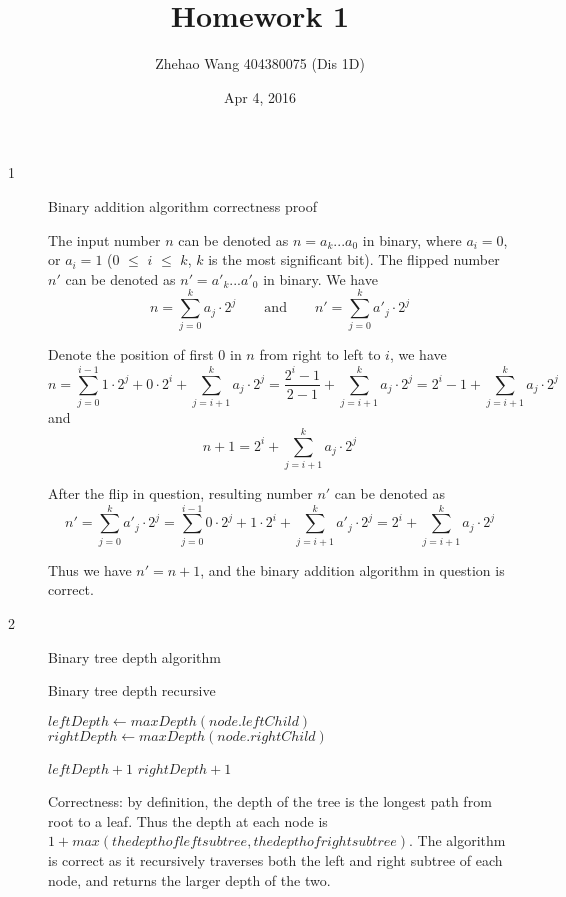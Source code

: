\documentclass{article}
\title{Homework 1}
\author{Zhehao Wang 404380075 (Dis 1D)}
\date{Apr 4, 2016}
\begin{document}
\maketitle

\begin{description}

\item[1]{Binary addition algorithm correctness proof}
  
  The input number $n$ can be denoted as $n=a_k...a_0$ in binary, where $a_i=0$, or $a_i=1$ ($0$ $\leq$ $i$ $\leq$ $k$, $k$ is the most significant bit). The flipped number $n'$ can be denoted as  $n'=a'_k...a'_0$ in binary.
  We have 
  \[
  n = \sum_{j=0}^{k}{a_j \cdot 2^j}
  \qquad \text{and} \qquad 
  n' = \sum_{j=0}^{k}{a'_j \cdot 2^j}
  \]
  
  Denote the position of first $0$ in $n$ from right to left to $i$, we have 
  $$n = \sum_{j=0}^{i-1}{1 \cdot 2^j} + 0 \cdot 2^i + \sum_{j=i+1}^{k}{a_j \cdot 2^j} = \frac{2^i-1}{2-1} + \sum_{j=i+1}^{k}{a_j \cdot 2^j} = 2^i - 1 + \sum_{j=i+1}^{k}{a_j \cdot 2^j}$$ 
  and
  $$n + 1 = 2^i + \sum_{j=i+1}^{k}{a_j \cdot 2^j}$$

  After the flip in question, resulting number $n'$ can be denoted as
  $$n' = \sum_{j=0}^{k}{a'_j \cdot 2^j} = \sum_{j=0}^{i-1}{0 \cdot 2^j} + 1 \cdot 2^i + \sum_{j=i+1}^{k}{a'_j \cdot 2^j} = 2^i + \sum_{j=i+1}^{k}{a_j \cdot 2^j}$$

  Thus we have $n' = n + 1$, and the binary addition algorithm in question is correct.

\item[2]{Binary tree depth algorithm}

  \begin{algorithm}
  \caption{Binary tree depth recursive}
    \begin{algorithmic}[1]
        \State {}
      \EndIf

      \State $leftDepth \gets maxDepth(node.leftChild)$
      \State $rightDepth \gets maxDepth(node.rightChild)$

        \State \Return $leftDepth + 1$
      \Else {} 
        \State \Return $rightDepth + 1$
      \EndIf
    \EndFunction
    \end{algorithmic}
  \end{algorithm}

  Correctness: by definition, the depth of the tree is the longest path from root to a leaf. Thus the depth at each node is $1 + max(the depth of left subtree, the depth of right subtree)$. The algorithm is correct as it recursively traverses both the left and right subtree of each node, and returns the larger depth of the two.


\end{description}
\end{document}
